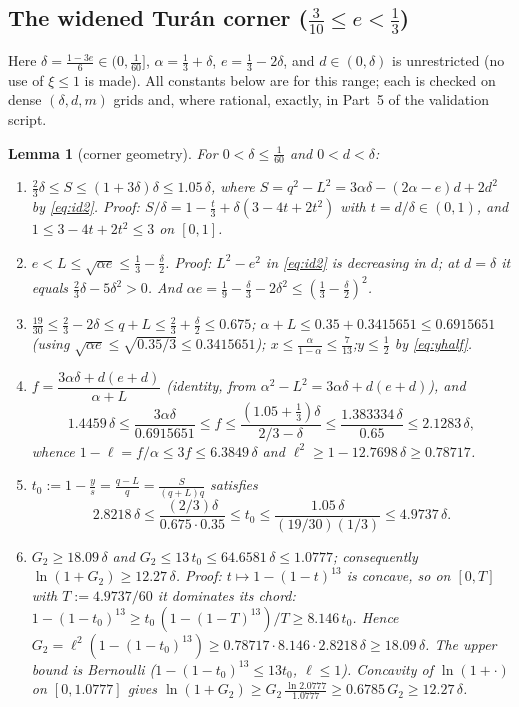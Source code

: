 \documentclass[11pt]{article}
\newtheorem{lemma}[theorem]{Lemma}
\theoremstyle{remark}
\theoremstyle{plain}
\theoremstyle{plain}
\begin{document}
\subsection{The widened Tur\'an corner ($\tfrac3{10}\le e<\tfrac13$)}
\label{sec:zoneC-wide}

Here $\delta=\tfrac{1-3e}6\in(0,\tfrac1{60}]$, $\alpha=\tfrac13+\delta$,
$e=\tfrac13-2\delta$, and $d\in(0,\delta)$ is unrestricted (no use of
$\xi\le1$ is made).  All constants below are for this range; each is checked
on dense $(\delta,d,m)$ grids and, where rational, exactly, in Part~5 of the
validation script.

\begin{lemma}[corner geometry]\label{lem:zc-corner-geo}
For $0<\delta\le\tfrac1{60}$ and $0<d<\delta$:
\begin{enumerate}
\item[(C1)] $\tfrac23\delta\le S\le(1+3\delta)\delta\le1.05\,\delta$, where
 $S=q^2-L^2=3\alpha\delta-(2\alpha-e)d+2d^2$ by \eqref{eq:id2}.
 \emph{Proof:} $S/\delta=1-\tfrac t3+\delta(3-4t+2t^2)$ with
 $t=d/\delta\in(0,1)$, and $1\le3-4t+2t^2\le3$ on $[0,1]$.
\item[(C2)] $e<L\le\sqrt{\alpha e}\le\tfrac13-\tfrac\delta2$.
 \emph{Proof:} $L^2-e^2$ in \eqref{eq:id2} is decreasing in $d$; at
 $d=\delta$ it equals $\tfrac23\delta-5\delta^2>0$.  And
 $\alpha e=\tfrac19-\tfrac\delta3-2\delta^2
 \le(\tfrac13-\tfrac\delta2)^2$.
\item[(C3)] $\tfrac{19}{30}\le\tfrac23-2\delta\le q+L\le\tfrac23
 +\tfrac\delta2\le0.675$;\quad
 $\alpha+L\le0.35+0.3415651\le0.6915651$
 (using $\sqrt{\alpha e}\le\sqrt{0.35/3}\le0.3415651$);\quad
 $x\le\tfrac\alpha{1-\alpha}\le\tfrac7{13}$;\quad $y\le\tfrac12$
 by \eqref{eq:yhalf}.
\item[(C4)] $f=\dfrac{3\alpha\delta+d(e+d)}{\alpha+L}$
 (identity, from $\alpha^2-L^2=3\alpha\delta+d(e+d)$), and
 \[
  1.4459\,\delta\le\frac{3\alpha\delta}{0.6915651}\le f
  \le\frac{(1.05+\tfrac13)\delta}{2/3-\delta}\le
  \frac{1.383334\,\delta}{0.65}\le2.1283\,\delta,
 \]
 whence $1-\ell=f/\alpha\le3f\le6.3849\,\delta$ and
 $\ell^2\ge1-12.7698\,\delta\ge0.78717$.
\item[(C5)] $t_0:=1-\tfrac ys=\tfrac{q-L}q=\tfrac S{(q+L)q}$ satisfies
 \[
  2.8218\,\delta\le\frac{(2/3)\delta}{0.675\cdot0.35}\le t_0\le
  \frac{1.05\,\delta}{(19/30)(1/3)}\le4.9737\,\delta .
 \]
\item[(C6)] $G_2\ge18.09\,\delta$ and $G_2\le13\,t_0\le64.6581\,\delta
 \le1.0777$; consequently $\ln(1+G_2)\ge12.27\,\delta$.
 \emph{Proof:} $t\mapsto1-(1-t)^{13}$ is concave, so on
 $[0,T]$ with $T:=4.9737/60$ it dominates its chord:
 $1-(1-t_0)^{13}\ge t_0\,(1-(1-T)^{13})/T\ge8.146\,t_0$.  Hence
 $G_2=\ell^2(1-(1-t_0)^{13})\ge0.78717\cdot8.146\cdot2.8218\,\delta
 \ge18.09\,\delta$.  The upper bound is Bernoulli
 ($1-(1-t_0)^{13}\le13t_0$, $\ell\le1$).  Concavity of $\ln(1+\cdot)$ on
 $[0,1.0777]$ gives
 $\ln(1+G_2)\ge G_2\,\tfrac{\ln2.0777}{1.0777}\ge0.6785\,G_2
 \ge12.27\,\delta$.
\end{enumerate}
\end{lemma}
\end{document}
